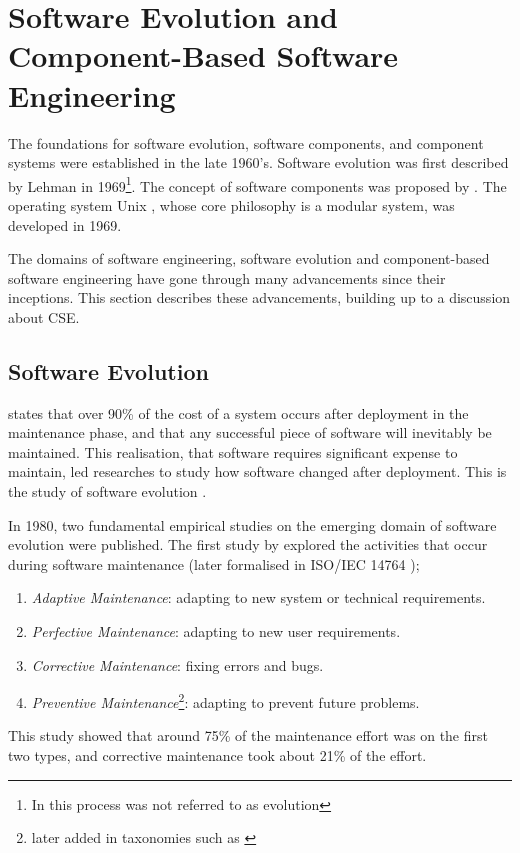 \section{Software Evolution and Component-Based Software Engineering}
\label{background.histories}
The foundations for software evolution, software components, and component systems were established in the late 1960's.
Software evolution was first described by Lehman in 1969\footnote{In \cite{Lehman1969} this process was not referred to as evolution}.
The concept of software components was proposed by \cite{McIlroy1969}.
The operating system Unix \citep{raymond2003art}, whose core philosophy is a modular system, was developed in 1969.

The domains of software engineering, software evolution and component-based software engineering have gone through many advancements since their inceptions.
This section describes these advancements, building up to a discussion about CSE.

\subsection{Software Evolution}
\cite{Brooks1975} states that over 90\% of the cost of a system occurs after deployment in the maintenance phase,
and that any successful piece of software will inevitably be maintained.
This realisation, that software requires significant expense to maintain, led researches to study how software changed after deployment.
This is the study of software evolution \citep{lehman1980}.

In 1980, two fundamental empirical studies on the emerging domain of software evolution were published.
The first study by \cite{Lientz1980} explored the activities that occur during software maintenance (later formalised in ISO/IEC 14764 \citep{IsoIec2006});
\begin{enumerate}
	\item \textit{Adaptive Maintenance}: adapting to new system or technical requirements.
	\item \textit{Perfective Maintenance}: adapting to new user requirements.
	\item \textit{Corrective Maintenance}: fixing errors and bugs.
	\item \textit{Preventive Maintenance}\footnote{later added in taxonomies such as \citep{iee1990ieee}}: adapting to prevent future problems.
\end{enumerate}

This study showed that around 75\% of the maintenance effort was on the first two types, and corrective maintenance took about 21\% of the effort.

